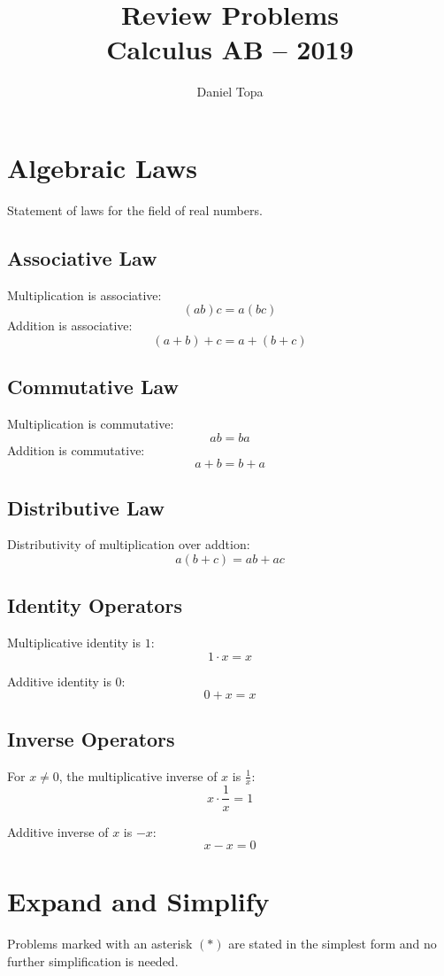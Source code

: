 \documentclass[11pt, oneside]{article}   	%
\title{Review Problems\\Calculus AB -- 2019}
\author{Daniel Topa}
\begin{document}
\maketitle

\section{Algebraic Laws}
Statement of laws for the field of real numbers.

\subsection{Associative Law}
\noindent Multiplication is associative:
$$(a b)c=a(bc)$$
\noindent Addition is associative:
$$(a+b)+c = a + (b+c)$$

\subsection{Commutative Law}
\noindent Multiplication is commutative:
$$ab=ba$$
\noindent Addition is commutative:
$$a+b=b+a$$

\subsection{Distributive Law}
\noindent Distributivity of multiplication over addtion:
$$a(b+c)=ab+ac$$

\subsection{Identity Operators}
\noindent Multiplicative identity is $1$:
$$1\cdot x = x$$

\noindent Additive identity is $0$:
$$0 + x = x$$

\subsection{Inverse Operators}
\noindent For $x\ne0$, the multiplicative inverse of $x$ is $\frac{1}{x}$:
$$x\cdot \frac{1}{x} = 1$$

\noindent Additive inverse of $x$ is $-x$:
$$x-x = 0$$


\section{Expand and Simplify}
Problems marked with an asterisk $(*)$ are stated in the simplest form and no further simplification is needed.
\end{document}

